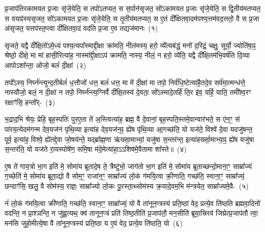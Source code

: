 \setcounter{anuvakam}{0}
प्र॒जा\-प॑तिरकामयत प्र॒जाः सृ॑जे॒येति॒ स तपो॑\-ऽतप्यत॒ स स॒र्पान॑सृजत॒ सो॑\-ऽकामयत प्र॒जाः सृ॑जे॒येति॒ स द्वि॒तीय॑म\-तप्यत॒ स वयाꣴ॑स्यसृजत॒ सो॑\-ऽकामयत प्र॒जाः सृ॑जे॒येति॒ स तृ॒तीय॑मतप्यत॒ स ए॒तं दी᳚क्षितवा॒दम॑पश्य॒त्तम॑वद॒त्ततो॒ वै स प्र॒जा अ॑सृजत॒ यत्तप॑स्त॒प्त्वा दी᳚क्षितवा॒दं वद॑ति प्र॒जा ए॒व तद्यज॑मानः~(१)

सृजते॒ यद्वै दी᳚क्षि॒तो॑\-ऽमे॒ध्यं पश्य॒त्यपा᳚स्माद्दी॒क्षा क्रा॑मति॒ नील॑मस्य॒ हरो॒ व्ये᳚त्यब॑द्धं॒ मनो॑ द॒रिद्रं॒ चक्षुः॒ सूर्यो॒ ज्योति॑षा॒ꣴ॒ श्रेष्ठो॒ दीक्षे॒ मा मा॑ हासी॒रित्या॑ह॒ नास्मा᳚द्दी॒क्षाऽप॑ क्रामति॒ नास्य॒ नीलं॒ न हरो॒ व्ये॑ति॒ यद्वै दी᳚क्षि॒तम॑भि॒वर्\mbox{}ष॑ति दि॒व्या आपो\-ऽशा᳚न्ता॒ ओजो॒ बलं॑ दी॒क्षां~(२)

तपो᳚\-ऽस्य॒ निर्घ्न॑न्त्युन्द॒तीर्बलं॑ ध॒त्तौजो॑ धत्त॒ बलं॑ धत्त॒ मा मे॑ दी॒क्षां मा तपो॒ निर्व॑धि॒ष्टेत्या॑है॒तदे॒व सर्व॑मा॒त्मन्ध॑त्ते॒ नास्यौजो॒ बलं॒ न दी॒क्षां न तपो॒ निर्घ्न॑न्त्य॒ग्निर्वै दी᳚क्षि॒तस्य॑ दे॒वता॒ सो᳚\-ऽस्मादे॒तर्\mbox{}हि॑ ति॒र इ॑व॒ यर्\mbox{}हि॒ याति॒ तमी᳚श्व॒रꣳ रक्षाꣳ॑सि॒ हन्तो᳚र्-~(३)

भ॒द्राद॒भि श्रेयः॒ प्रेहि॒ बृह॒स्पतिः॑ पुरए॒ता ते॑ अ॒स्त्वित्या॑ह॒ ब्रह्म॒ वै दे॒वानां॒ बृह॒स्पति॒स्तमे॒वान्वार॑भते॒ स ए॑न॒ꣳ॒ सं पा॑रय॒त्येदम॑गन्म देव॒यज॑नं पृथि॒व्या इत्या॑ह देव॒यज॑न॒ꣴ॒ ह्ये॑ष पृ॑थि॒व्या आ॒गच्छ॑ति॒ यो यज॑ते॒ विश्वे॑ दे॒वा यदजु॑षन्त॒ पूर्व॒ इत्या॑ह॒ विश्वे॒ ह्ये॑तद्दे॒वा जो॒षय॑न्ते॒ यद्ब्रा᳚ह्म॒णा ऋ॑ख्सा॒माभ्यां॒ यजु॑षा स॒न्तर॑न्त॒ इत्या॑हर्ख्सा॒माभ्या॒ꣴ॒ ह्ये॑ष यजु॑षा स॒न्तर॑ति॒ यो यज॑ते रा॒यस्पोषे॑ण॒ समि॒षा म॑दे॒मेत्या॑हा॒ऽऽशिष॑मे॒वैतामा शा᳚स्ते॥~(४)

{\anuvakamend[{यज॑मानो दी॒क्षाꣳ हन्तो᳚र्ब्राह्म॒णाश्चतु॑र्विꣳशतिश्च}]}%

ए॒ष ते॑ गाय॒त्रो भा॒ग इति॑ मे॒ सोमा॑य ब्रूतादे॒ष ते॒ त्रैष्टु॑भो॒ जाग॑तो भा॒ग इति॑ मे॒ सोमा॑य ब्रूताच्छन्दो॒माना॒ꣳ॒ साम्रा᳚ज्यं ग॒च्छेति॑ मे॒ सोमा॑य ब्रूता॒द्यो वै सोम॒ꣳ॒ राजा॑न॒ꣳ॒ साम्रा᳚ज्यं लो॒कं ग॑मयि॒त्वा क्री॒णाति॒ गच्छ॑ति॒ स्वाना॒ꣳ॒ साम्रा᳚ज्यं॒ छन्दाꣳ॑सि॒ खलु॒ वै सोम॑स्य॒ राज्ञः॒ साम्रा᳚ज्यो लो॒कः पु॒रस्ता॒थ्सोम॑स्य क्र॒यादे॒वम॒भि म॑न्त्रयेत॒ साम्रा᳚ज्यमे॒वै-~(५)

नं॑ लो॒कं ग॑मयि॒त्वा क्री॑णाति॒ गच्छ॑ति॒ स्वाना॒ꣳ॒ साम्रा᳚ज्यं॒ यो वै ता॑नून॒प्त्रस्य॑ प्रति॒ष्ठां वेद॒ प्रत्ये॒व ति॑ष्ठति ब्रह्मवा॒दिनो॑ वदन्ति॒ न प्रा॒श्ञन्ति॒ न जु॑ह्व॒त्यथ॒ क्व॑ तानून॒प्त्रं प्रति॑ तिष्ठ॒तीति॑ प्र॒जा\-प॑तौ॒ मन॒सीति॑ ब्रूया॒त्त्रिरव॑ जिघ्रेत्प्र॒जा\-प॑तौ त्वा॒ मन॑सि जुहो॒मीत्ये॒षा वै ता॑नून॒प्त्रस्य॑ प्रति॒ष्ठा य ए॒वं वेद॒ प्रत्ये॒व ति॑ष्ठति॒ यो~(६)

